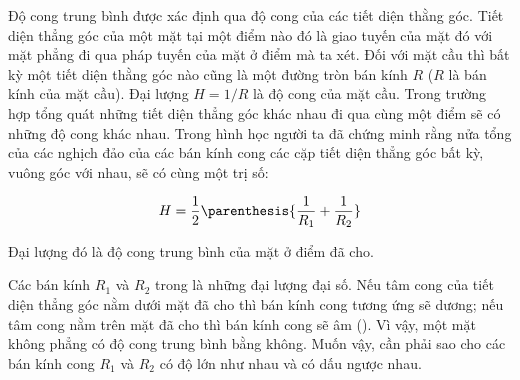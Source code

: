 Độ cong trung bình được xác định qua độ cong của các tiết diện thằng góc. Tiết diện thẳng góc của một mặt tại một điểm nào đó là giao tuyến của mặt đó với mặt phẳng đi qua pháp tuyến của mặt ở điểm mà ta xét. Đối với mặt cầu thì bất kỳ một tiết diện thằng góc nào cũng là một đường tròn bán kính $R$ ($R$ là bán kính của mặt cầu). Đại lượng $H=1/R$ là độ cong của mặt cầu. Trong trường hợp tổng quát những tiết diện thẳng góc khác nhau đi qua cùng một điểm sẽ có những độ cong khác nhau. Trong hình học người ta đã chứng minh rằng nửa tổng của các nghịch đảo của các bán kính cong các cặp tiết diện thẳng góc bất kỳ, vuông góc với nhau, sẽ có cùng một trị số:

\begin{equation}\label{eq:14_2}
	H = \frac{1}{2}\parenthesis{\frac{1}{R_1} + \frac{1}{R_2}}
\end{equation}

\noindent


Đại lượng đó là độ cong trung bình của mặt ở điểm đã cho. 


Các bán kính $R_1$ và $R_2$ trong  là những đại lượng đại số. Nếu tâm cong của tiết diện thẳng góc nằm dưới mặt đã cho thì bán kính cong tương ứng sẽ dương; nếu tâm cong nằm trên mặt đã cho thì bán kính cong sẽ âm (). Vì vậy, một mặt không phẳng có độ cong trung bình bằng không. Muốn vậy, cần phải sao cho các bán kính cong $R_1$ và $R_2$ có độ lớn như nhau và có dấu ngược nhau.

